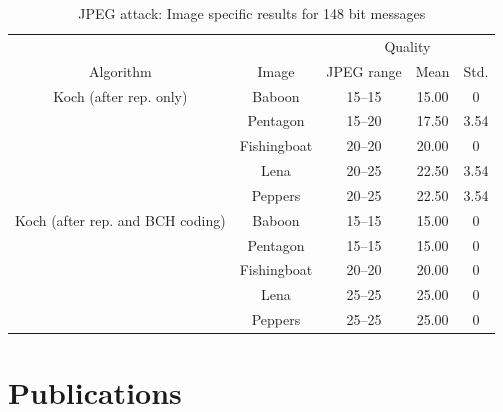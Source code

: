 \documentclass[12pt]{report}
\begin{document}
\begin{table}[!ht]
\tiny
        \begin{center}
                \begin{tabular}{|c|c|c|c|c|} \hline
					& 		& \multicolumn{3}{c|}{Quality}	\\ \cline{3-5}
                Algorithm               & Image         & JPEG range & Mean          & Std. \\ \hline\hline
                Koch (after rep. only)  & Baboon        & 15--15                 & 15.00            & 0  \\ \cline{2-5}
                			& Pentagon      & 15--20                 & 17.50            & 3.54  \\ \cline{2-5} 
               	 			& Fishingboat   & 20--20                 & 20.00            & 0  \\ \cline{2-5} 
                			& Lena          & 20--25                 & 22.50            & 3.54  \\ \cline{2-5} 
                			& Peppers       & 20--25                 & 22.50            & 3.54  \\ \hline\hline

                Koch (after rep. and BCH coding)  & Baboon      & 15--15                 & 15.00            & 0  \\ \cline{2-5} 
                				& Pentagon      & 15--15                 & 15.00            & 0  \\ \cline{2-5} 
                				& Fishingboat   & 20--20                 & 20.00            & 0 \\ \cline{2-5} 
                				& Lena          & 25--25                 & 25.00            & 0  \\ \cline{2-5} 
                				& Peppers       & 25--25                 & 25.00            & 0  \\ \hline
        \end{tabular}
        \caption{JPEG attack: Image specific results for 148 bit messages}
	\label{tab:imgSpecific148BK32_63_148}
        \end{center}
\end{table}
\normalsize





\chapter{Publications}
\end{document}
